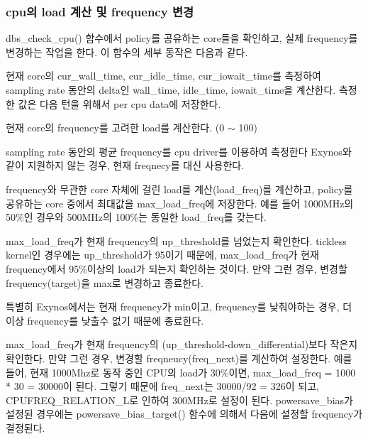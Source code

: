 \subsubsection{cpu의 load 계산 및 frequency 변경}
dbs\_check\_cpu() 함수에서 policy를 공유하는 core들을 확인하고, 실제 frequency를 변경하는 작업을 한다. 
이 함수의 세부 동작은 다음과 같다. 
\begin{compactenum}
\item 현재 core의 cur\_wall\_time, cur\_idle\_time, cur\_iowait\_time를 측정하여
sampling rate 동안의 delta인 wall\_time, idle\_time, iowait\_time을 계산한다. 
측정한 값은 다음 턴을 위해서 per cpu data에 저장한다.
\item 현재 core의 frequency를 고려한 load를 계산한다. (0 $\sim$ 100)
\item sampling rate 동안의 평균 frequency를 cpu driver를 이용하여 측정한다
Exynos와 같이 지원하지 않는 경우, 현재 freqnecy를 대신 사용한다.
\item frequency와 무관한 core 자체에 걸린 load를 계산(load\_freq)를 계산하고, 
policy를 공유하는 core 중에서 최대값을 max\_load\_freq에 저장한다. 
예를 들어 1000MHz의 50\%인 경우와 500MHz의 100\%는 동일한 load\_freq를 갖는다.
\item max\_load\_freq가 현재 frequency의 up\_threshold를 넘었는지 확인한다. 
tickless kernel인 경우에는 up\_threshold가 95이기 때문에, 
max\_load\_freq가 현재 frequency에서 95\%이상의 load가 되는지 확인하는 것이다. 
만약 그런 경우, 변경할 frequency(target)을 max로 변경하고 종료한다. 
\item 특별히 Exynos에서는 현재 frequency가 min이고, frequency를 낮춰야하는 경우, 
더 이상 frequency를 낮출수 없기 때문에 종료한다. 
\item max\_load\_freq가 현재 frequency의 (up\_threshold-down\_differential)보다 작은지 확인한다. 
만약 그런 경우, 변경할 freqneucy(freq\_next)를 계산하여 설정한다. 
예를 들어, 현재 1000Mhz로 동작 중인 CPU의 load가 30\%이면, max\_load\_freq = 1000 * 30 = 30000이 된다. 
그렇기 때문에 freq\_next는 30000/92 = 326이 되고, CPUFREQ\_RELATION\_L로 인하여 300MHz로 설정이 된다. 
powersave\_bias가 설정된 경우에는 powersave\_bias\_target() 함수에 의해서 다음에 설정할 frequency가 결정된다.
\end{compactenum}

